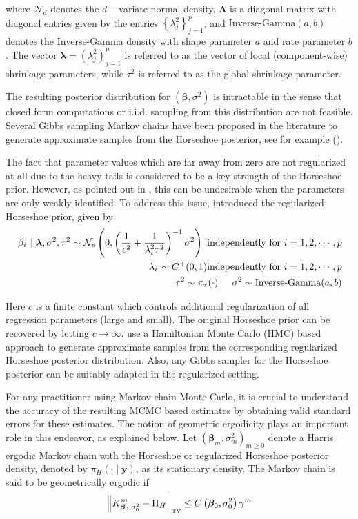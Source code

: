 \documentclass[noinfoline,11pt]{imsart}
\numberwithin{equation}{section}
\theoremstyle{plain}
\newcommand{\y}{\mathbf{y}}
\newcommand{\bb}{\boldsymbol{\beta}}
\newcommand{\bl}{\boldsymbol{\lambda}}
\newcommand{\Bl}{\boldsymbol{\Lambda}}
\newcommand\Myciteauthor[1]{\citeauthor{#1} \cite{#1}}
\begin{document}
\noindent
where $\mathcal{N}_d$ denotes the $d-$variate normal density, $\Bl$ is a diagonal matrix with diagonal entries given by the entries $\left\{\lambda_j^2\right\}_{j=1}^p$, and $\text{Inverse-Gamma}(a,b)$ denotes the Inverse-Gamma density with shape parameter $a$ and rate parameter $b$. The vector $\bl = (\lambda_j^2)_{j=1}^p$ is referred to as the vector of local (component-wise) shrinkage parameters, while $\tau^2$ is referred to as the global shrinkage parameter. 

The resulting posterior distribution for $(\bb, \sigma^2)$ is intractable in the sense that closed form computations or i.i.d. sampling from this distribution are not feasible. Several Gibbs sampling Markov chains have been proposed in the literature to generate approximate samples from the Horseshoe posterior, see for example (\cite{10.1093/biomet/asw042, f521496bc3f649b2a2d7eda0124887a5, johndrow2017bayes, Makalic_2016}). 

The fact that parameter values which are far away from zero are not regularized at all due to the heavy tails is considered to be a key strength of the Horseshoe prior. However, as pointed out in \Myciteauthor{piironen2017}, this can be undesirable when the parameters are only weakly identified. To address this issue, \cite{piironen2017} introduced the regularized Horseshoe prior, given by 
\begin{eqnarray*}
\left.\beta_i \right. \mid \bl, \sigma^2,\tau^2\sim \mathcal{N}_p \left( 0, \left( \frac{1}{c^2} + \frac{1}{\lambda_i^2 \tau^2} \right)^{-1} \sigma^2 \right) \text{ independently for}\ i=1,2,\cdots,p \\
\left.\lambda_i\right.\sim C^+ (0,1) \text{independently for}\ i=1,2,\cdots,p \\
\tau^2\sim \pi_\tau (\cdot) \hspace{0.2in} \sigma^2\sim 
\text{Inverse-Gamma}(a,b)
\end{eqnarray*}

\noindent
Here $c$ is a finite constant which controls additional regularization of all regression parameters (large and small). The original Horseshoe prior can be recovered by letting $c \rightarrow \infty$. \Myciteauthor{piironen2017} use a Hamiltonian Monte Carlo (HMC) based approach to generate approximate samples from the corresponding regularized Horseshoe posterior distribution. Also, any Gibbs sampler 
for the Horseshoe posterior can be suitably adapted in the regularized setting. 

For any practitioner using Markov chain Monte Carlo, it is crucial to understand the accuracy of the resulting MCMC based estimates by obtaining valid standard errors for these estimates. The notion of geometric ergodicity plays an important role in this endeavor, as explained below. Let $(\bb_m, \sigma^2_m)_{m \geq 0}$ denote a Harris ergodic Markov chain with the Horseshoe or regularized Horseshoe posterior density, denoted by $\pi_H (\cdot \mid \y)$, as its stationary density. The Markov chain is said to be geometrically ergodic if 
$$
\left\| K_{\bb_0, \sigma^2_0}^m - \Pi_H \right\|_{\mbox{\tiny{TV}}} \leq C\left(\bb_0, \sigma^2_0\right) \gamma^m 
$$
\end{document}
